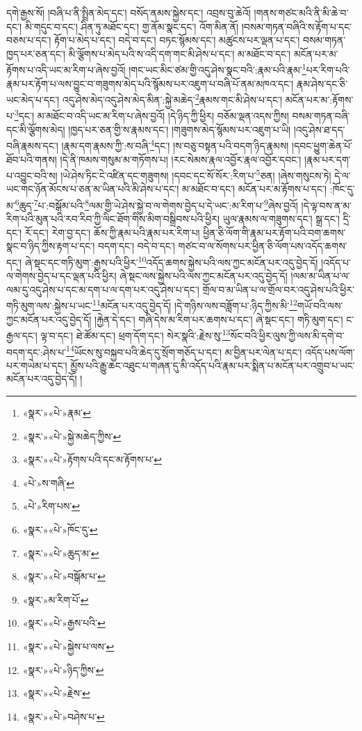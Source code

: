 དགེ་རྒྱས་སོ། །བཞི་པ་ནི་སྤྲིན་མེད་དང་། བསོད་ནམས་སྐྱེས་དང་། འབྲས་བུ་ཆེའོ། །གནས་གཙང་མའི་ནི་མི་ཆེ་བ་དང་། མི་གདུང་བ་དང་། ཤིན་ཏུ་མཐོང་དང་། གྱ་ནོམ་སྣང་དང་། འོག་མིན་ནོ། །བསམ་གཏན་བཞིའི་ས་རྟོག་པ་དང་བཅས་པ་དང་། རྟོག་པ་མེད་པ་དང་། བདེ་བ་དང་། བཏང་སྙོམས་དང་། མཚུངས་པར་ལྡན་པ་དང་། བསམ་གཏན་ཁྱད་པར་ཅན་དང་། མི་ལྕོགས་པ་མེད་པའི་ས་འདི་དག་གང་མི་ཤེས་པ་དང་། མ་མཐོང་བ་དང་། མངོན་པར་མ་རྟོགས་པ་འདི་ཡང་མ་རིག་པ་ཞེས་བྱའོ། །གང་ཡང་མིང་ཙམ་གྱི་འདུ་ཤེས་སྣང་བའི་:རྣམ་པའི་རྣམ་\footnote{«སྣར་»«པེ་»རྣམ་}པར་རིག་པའི་རྣམ་པར་རྟོག་པ་ལས་བྱུང་བ་གཟུགས་མེད་པའི་སྙོམས་པར་འཇུག་པ་བཞི་པོ་ནམ་མཁའ་དང་། རྣམ་ཤེས་དང་ཅི་ཡང་མེད་པ་དང་། འདུ་ཤེས་མེད་འདུ་ཤེས་མེད་མིན་:སྐྱེ་མཆེད་\footnote{«སྣར་»«པེ་»སྐྱེ་མཆེད་ཀྱིས་}རྣམས་གང་མི་ཤེས་པ་དང་། མངོན་པར་མ་:རྟོགས་པ་\footnote{«སྣར་»«པེ་»རྟོགས་པའི་དང་མ་རྟོགས་པ་}དང་། མ་མཐོང་བ་འདི་ཡང་མ་རིག་པ་ཞེས་བྱའོ། །དེ་ཉིད་ཀྱི་ཕྱིར། བཅོམ་ལྡན་འདས་ཀྱིས། བསམ་གཏན་བཞི་དང་མི་ལྕོགས་མེད། །ཁྱད་པར་ཅན་གྱི་ས་རྣམས་དང་། །གཟུགས་མེད་སྙོམས་པར་འཇུག་པ་ཡི། །འདུ་ཤེས་ཐ་དད་བཞི་རྣམས་དང་། །རྣམ་དག་རྣམས་ཀྱི་:ས་བཞི་\footnote{«པེ་»ས་གཞི་}དང་། །ས་བཅུ་བསྟན་པའི་བདག་ཉིད་རྣམས། །དབང་ཕྱུག་ཆེན་པོ་ཐོབ་པའི་གནས། །དེ་ནི་ཁམས་གསུམ་མ་གཏོགས་པ། །རང་སེམས་རྣལ་འབྱོར་རྣལ་འབྱོར་དབང་། །རྣམ་པར་དག་པ་འབྱུང་བའི་ས། །ཡེ་ཤེས་ཏིང་ངེ་འཛིན་དང་གཟུགས། །དབང་དང་སོ་སོར་:རིག་པ་\footnote{«པེ་»རིག་པས་}ཅན། །ཞེས་གསུངས་ཏེ། དེ་ལ་ཡང་གང་ཉོན་མོངས་པ་ཅན་མ་ཡིན་པའི་མི་ཤེས་པ་དང་། མ་མཐོང་བ་དང་། མངོན་པར་མ་རྟོགས་པ་དང་། :ཁོང་དུ་མ་\footnote{«སྣར་»«པེ་»ཁོང་དུ་}ཆུད་\footnote{«སྣར་»«པེ་»ཆུད་མ་}པ་:བསྒོམ་པའི་\footnote{«སྣར་»«པེ་»བསྒོམ་པ་}ལམ་གྱི་ཡེ་ཤེས་སྐྱེ་བ་ལ་གེགས་བྱེད་པ་དེ་ཡང་:མ་རིག་པ་\footnote{«སྣར་»མ་རིག་པོ་}ཞེས་བྱའོ། །དེ་ལྟ་བས་ན་མ་རིག་པའི་མུན་པའི་རབ་རིབ་ཀྱི་ལིང་ཐོག་གིས་མིག་བསྒྲིབས་པའི་ཕྱིར། ཡུལ་རྣམས་ལ་གཟུགས་དང་། སྒྲ་དང་། དྲི་དང་། རོ་དང་། རེག་བྱ་དང་། ཆོས་ཀྱི་རྣམ་པའི་རྣམ་པར་རིག་པ། ཕྱིན་ཅི་ལོག་གི་རྣམ་པར་རྟོག་པའི་བག་ཆགས་སྣང་བ་ཉིད་ཀྱིས་རྟག་པ་དང་། བདག་དང་། བདེ་བ་དང་། གཙང་བ་ལ་སོགས་པར་ཕྱིན་ཅི་ལོག་པས་འདོད་ཆགས་དང་། ཞེ་སྡང་དང་གཏི་མུག་:རྒྱས་པའི་ཕྱིར་\footnote{«སྣར་»«པེ་»རྒྱས་པའི་}འདོད་ཆགས་སྐྱེས་པའི་ལས་ཀྱང་མངོན་པར་འདུ་བྱེད་དོ། །འདོད་པ་ལ་གེགས་བྱེད་པ་དང་ལྡན་པའི་ཕྱིར། ཞེ་སྡང་ལས་སྐྱེས་པའི་ལས་ཀྱང་མངོན་པར་འདུ་བྱེད་དོ། །ལམ་མ་ཡིན་པ་ལ་ལམ་དུ་འདུ་ཤེས་པ་དང་མ་དག་པ་ལ་དག་པར་འདུ་ཤེས་པ་དང་། གྲོལ་བ་མ་ཡིན་པ་ལ་གྲོལ་བར་འདུ་ཤེས་པའི་ཕྱིར་གཏི་མུག་ལས་:སྐྱེས་པ་ཡང་\footnote{«སྣར་»«པེ་»སྐྱེས་པ་ལས་}མངོན་པར་འདུ་བྱེད་དོ། །དེ་གཉིས་ལས་བཟློག་པ་:ཉིད་ཀྱིས་མི་\footnote{«སྣར་»«པེ་»ཉིད་ཀྱིས་}གཡོ་བའི་ལས་ཀྱང་མངོན་པར་འདུ་བྱེད་དོ། །རྐྱེན་དེ་དང་། གཞི་དེས་མ་རིག་པར་ཆགས་པ་དང་། ཞེ་སྡང་དང་། གཏི་མུག་དང་། ང་རྒྱལ་དང་། ལྟ་བ་དང་། ཐེ་ཚོམ་དང་། ཕྲག་དོག་དང་། སེར་སྣའི་:རྗེས་སུ་\footnote{«སྣར་»«པེ་»རྗེས་}སོང་བའི་ཕྱིར་ལུས་ཀྱི་ལས་མི་དགེ་བ་བདག་དང་:ཤེས་པ་\footnote{«སྣར་»«པེ་»བཤེས་པ་}ཡོངས་སུ་བསྐྱབ་པའི་ཆེད་དུ་སྲོག་གཅོད་པ་དང་། མ་བྱིན་པར་ལེན་པ་དང་། འདོད་པས་ལོག་པར་གཡེམ་པ་དང་། མྱོས་པའི་རྒྱུ་ཆང་འཐུང་པ་གཞན་དུ་མི་འདོད་པའི་རྣམ་པར་སྨིན་པ་མངོན་པར་འགྲུབ་པ་ཡང་མངོན་པར་འདུ་བྱེད་དོ། །

